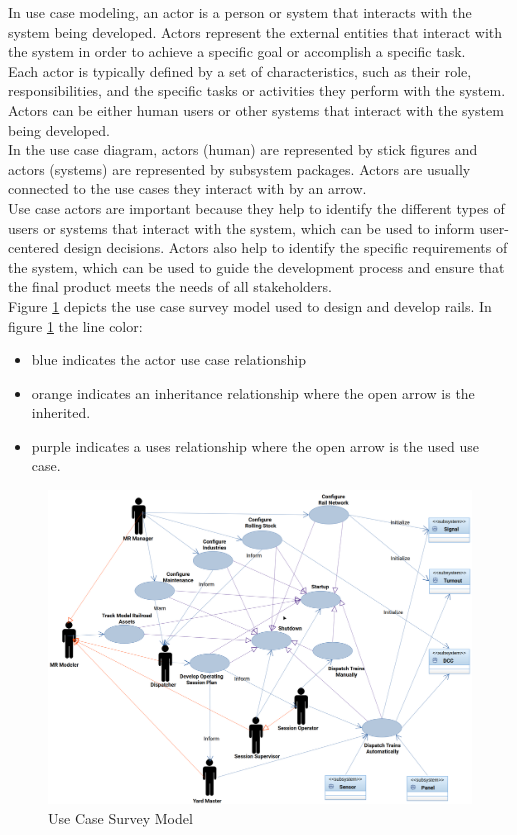 In use case modeling, an actor is a person or system that interacts with the system being developed. Actors represent the external entities that interact with the system in order to achieve a specific goal or accomplish a specific task.\vspace{5mm} \\
Each actor is typically defined by a set of characteristics, such as their role, responsibilities, and the specific tasks or activities they perform with the system. Actors can be either human users or other systems that interact with the system being developed.\vspace{5mm} \\
In the use case diagram, actors (human) are represented by stick figures and actors (systems) are represented by subsystem packages. Actors are usually connected to the use cases they interact with by an arrow.\vspace{5mm} \\
Use case actors are important because they help to identify the different types of users or systems that interact with the system, which can be used to inform user-centered design decisions. Actors also help to identify the specific requirements of the system, which can be used to guide the development process and ensure that the final product meets the needs of all stakeholders.\vspace{5mm} \\
Figure \ref{fig:use-case} depicts the use case survey model used to design and develop \gls{rails}.
In figure \ref{fig:use-case} the line color:
\begin{itemize}
  \item blue indicates the actor use case relationship
  \item orange indicates an inheritance relationship where the open arrow is the inherited.
  \item purple indicates a uses relationship where the open arrow is the used use case.
\end{itemize}
\begin{figure}
	\centering
		\includegraphics[scale=0.2]{../Images/use-case.png}
	\caption{Use Case Survey Model}
	\label{fig:use-case}
\end{figure}
